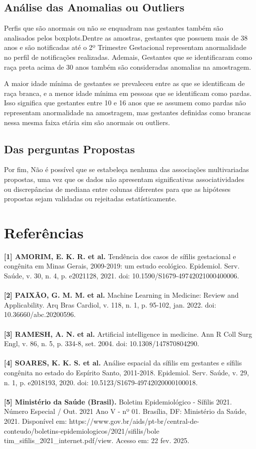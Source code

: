 \documentclass[a4paper]{article}
\begin{document}
\begin{multicols}
\subsection{Análise das Anomalias ou Outliers}
Perfis que são anormais ou não se enquadram nas gestantes também são analisados pelos boxplots.Dentre as amostras, gestantes que possuem mais de 38 anos e são notificadas até o 2º Trimestre Gestacional representam anormalidade no perfil de notificações realizadas. Ademais, Gestantes que se identificaram como raça preta acima de 30 anos também são consideradas anomalias na amostragem. 

A maior idade mínima de gestantes se prevaleceu entre as que se identificam de raça branca, e a menor idade mínima em pessoas que se identificam como pardas. Isso significa que gestantes entre 10 e 16 anos que se assumem como pardas não representam anormalidade na amostragem, mas gestantes definidas como brancas nessa mesma faixa etária sim são anormais ou outliers.

\subsection{Das perguntas Propostas}
Por fim, Não é possível que se estabeleça nenhuma das associações multivariadas propostas, uma vez que os dados não apresentam significativas associatividades ou discrepâncias de mediana entre colunas diferentes para que as hipóteses propostas sejam validadas ou rejeitadas estatísticamente.

\section{Referências}

\textbf{[1] AMORIM, E. K. R. et al.} Tendência dos casos de sífilis gestacional e congênita em Minas Gerais, 2009-2019: um estudo ecológico. Epidemiol. Serv. Saúde, v. 30, n. 4, p. e2021128, 2021. doi: 10.1590/S1679-49742021000400006.
\\\\
\textbf{[2] PAIXÃO, G. M. M. et al.} Machine Learning in Medicine: Review and Applicability. Arq Bras Cardiol, v. 118, n. 1, p. 95-102, jan. 2022. doi: 10.36660/abc.20200596.
\\\\
\textbf{[3] RAMESH, A. N. et al.} Artificial intelligence in medicine. Ann R Coll Surg Engl, v. 86, n. 5, p. 334-8, set. 2004. doi: 10.1308/147870804290.
\\\\
\textbf{[4] SOARES, K. K. S. et al.} Análise espacial da sífilis em gestantes e sífilis congênita no estado do Espírito Santo, 2011-2018. Epidemiol. Serv. Saúde, v. 29, n. 1, p. e2018193, 2020. doi: 10.5123/S1679-49742020000100018.
\\\\
\textbf{[5] Ministério da Saúde (Brasil).} Boletim Epidemiológico - Sífilis 2021. Número Especial / Out. 2021 Ano V - nº 01. Brasília, DF: Ministério da Saúde, 2021. Disponível em: https://www.gov.br/aids/pt-br/central-de-conteudo/boletins-epidemiologicos/2021/sifilis/bole\\tim\_sifilis\_2021\_internet.pdf/view. Acesso em: 22 fev. 2025.

\end{multicols}
\end{document}
